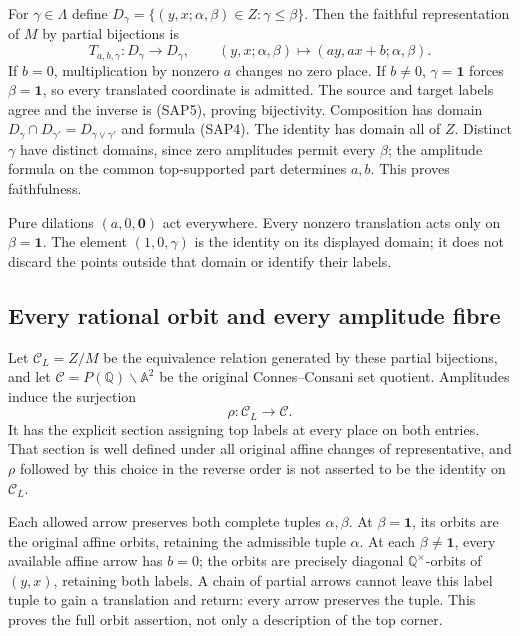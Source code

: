 For $\gamma\in\Lambda$ define
$D_\gamma=\{(y,x;\alpha,\beta)\in Z:\gamma\le\beta\}$.
Then the faithful representation of $M$ by partial bijections is
\begin{equation}\tag{SAP6}
T_{a,b,\gamma}:D_\gamma\longrightarrow D_\gamma,
\qquad (y,x;\alpha,\beta)\longmapsto(ay,ax+b;\alpha,\beta).
\end{equation}
If $b=0$, multiplication by nonzero $a$ changes no zero place.
If $b\ne0$, $\gamma=\boldsymbol1$ forces $\beta=\boldsymbol1$,
so every translated coordinate is admitted. The source and target
labels agree and the inverse is (SAP5), proving bijectivity.
Composition has domain
$D_\gamma\cap D_{\gamma'}=D_{\gamma\vee\gamma'}$ and formula
(SAP4). The identity has domain all of $Z$. Distinct $\gamma$
have distinct domains, since zero amplitudes permit every $\beta$;
the amplitude formula on the common top-supported part determines
$a,b$. This proves faithfulness.

Pure dilations $(a,0,\boldsymbol0)$ act everywhere. Every nonzero
translation acts only on $\beta=\boldsymbol1$. The element
$(1,0,\gamma)$ is the identity on its displayed domain; it does
not discard the points outside that domain or identify their labels.

\subsection{Every rational orbit and every amplitude fibre}

Let $\mathscr C_L=Z/M$ be the equivalence relation generated by
these partial bijections, and let
$\mathscr C=P(\mathbb Q)\backslash\mathbb A^2$ be the original
Connes--Consani set quotient. Amplitudes induce the surjection
\begin{equation}\tag{SAP7}
\rho:\mathscr C_L\longrightarrow\mathscr C.
\end{equation}
It has the explicit section assigning top labels at every place
on both entries. That section is well defined under all original
affine changes of representative, and $\rho$ followed by this
choice in the reverse order is not asserted to be the identity
on $\mathscr C_L$.

Each allowed arrow preserves both complete tuples $\alpha,\beta$.
At $\beta=\boldsymbol1$, its orbits are the original affine
orbits, retaining the admissible tuple $\alpha$. At each
$\beta\ne\boldsymbol1$, every available affine arrow has $b=0$;
the orbits are precisely diagonal $\mathbb Q^\times$-orbits of
$(y,x)$, retaining both labels. A chain of partial arrows cannot
leave this label tuple to gain a translation and return: every
arrow preserves the tuple. This proves the full orbit assertion,
not only a description of the top corner.

